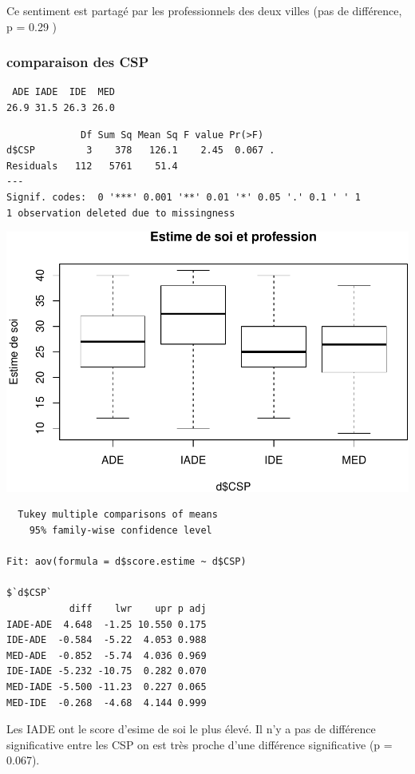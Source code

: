 \documentclass[]{article}
\begin{document}
Ce sentiment est partagé par les professionnels des deux villes (pas de
différence, p = 0.29 )

\subsubsection{comparaison des CSP}\label{comparaison-des-csp-3}

\begin{verbatim}
 ADE IADE  IDE  MED 
26.9 31.5 26.3 26.0 
\end{verbatim}

\begin{verbatim}
             Df Sum Sq Mean Sq F value Pr(>F)  
d$CSP         3    378   126.1    2.45  0.067 .
Residuals   112   5761    51.4                 
---
Signif. codes:  0 '***' 0.001 '**' 0.01 '*' 0.05 '.' 0.1 ' ' 1
1 observation deleted due to missingness
\end{verbatim}

\includegraphics{analyse_files/figure-latex/unnamed-chunk-26-1.pdf}

\begin{verbatim}
  Tukey multiple comparisons of means
    95% family-wise confidence level

Fit: aov(formula = d$score.estime ~ d$CSP)

$`d$CSP`
           diff    lwr    upr p adj
IADE-ADE  4.648  -1.25 10.550 0.175
IDE-ADE  -0.584  -5.22  4.053 0.988
MED-ADE  -0.852  -5.74  4.036 0.969
IDE-IADE -5.232 -10.75  0.282 0.070
MED-IADE -5.500 -11.23  0.227 0.065
MED-IDE  -0.268  -4.68  4.144 0.999
\end{verbatim}

Les IADE ont le score d'esime de soi le plus élevé. Il n'y a pas de
différence significative entre les CSP on est très proche d'une
différence significative (p = 0.067).
\end{document}
